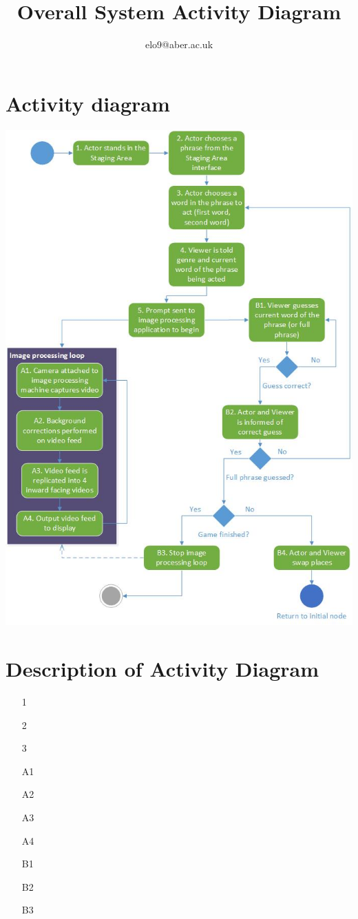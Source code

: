 \documentclass{article}
\title{Overall System Activity Diagram}
\author{elo9@aber.ac.uk}
\begin{document}
\maketitle
\tableofcontents

\newpage

\section{Activity diagram}
\includegraphics[width=\textwidth]{SystemActivityDiagramImage}

\newpage


\section{Description of Activity Diagram}
\begin{itemize}
	\item [1]
	
	\item [2]
	
	\item [3]
	
	\item [A1]
	
	\item [A2]
	
	\item [A3]
	
	\item [A4]
	
	\item [B1]
	
	\item [B2]
	
	\item [B3]
\end{itemize}
\end{document}
